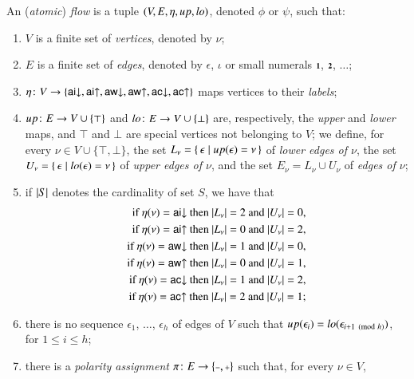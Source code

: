 \begin{definition}\label{definition:AtomicFlow}
An (\emph{atomic}) \emph{flow} is a tuple $(V,E,\eta,{\mathit up},{\mathit lo})$, denoted $\phi$ or $\psi$, such that:
\begin{enumerate}
\item $V$ is a finite set of \emph{vertices}, denoted by $\nu$;
\item $E$ is a finite set of \emph{edges}, denoted by $\epsilon$, $\iota$ or small numerals $\one$, $\two$, $\dots$;
\item $\eta\colon V\to\{{\mathsf{ai}{\downarrow}},{\mathsf{ai}{\uparrow}},{\mathsf{aw}{\downarrow}},{\mathsf{aw}{\uparrow}},{\mathsf{ac}{\downarrow}},{\mathsf{ac}{\uparrow}}\}$ maps vertices to their \emph{labels};
\item ${\mathit up}\colon E\to V\cup\{\top\}$ and ${\mathit lo}\colon E\to V\cup\{\bot\}$ are, respectively, the \emph{upper} and \emph{lower} maps, and $\top$ and $\bot$ are special vertices not belonging to $V$; we define, for every $\nu\in V\cup\{\top,\bot\}$, the set $L_\nu=\{\,\epsilon\mid{\mathit up}(\epsilon)=\nu\,\}$ of \emph{lower edges of $\nu$}, the set $U_\nu=\{\,\epsilon\mid{\mathit lo}(\epsilon)=\nu\,\}$ of \emph{upper edges of $\nu$}, and the set $E_\nu=L_\nu\cup U_\nu$ of \emph{edges of $\nu$};
\item if $\mathord\vert S\mathord\vert$ denotes the cardinality of set $S$, we have that
\begin{align*}
\mbox{if $\eta(\nu)={\mathsf{ai}{\downarrow}}$ then $\mathord\vert L_\nu\mathord\vert=2$ and $\mathord\vert U_\nu\mathord\vert=0$,}&\\
\mbox{if $\eta(\nu)={\mathsf{ai}{\uparrow}}$ then $\mathord\vert L_\nu\mathord\vert=0$ and $\mathord\vert U_\nu\mathord\vert=2$,}&\\
\mbox{if $\eta(\nu)={\mathsf{aw}{\downarrow}}$ then $\mathord\vert L_\nu\mathord\vert=1$ and $\mathord\vert U_\nu\mathord\vert=0$,}&\\
\mbox{if $\eta(\nu)={\mathsf{aw}{\uparrow}}$ then $\mathord\vert L_\nu\mathord\vert=0$ and $\mathord\vert U_\nu\mathord\vert=1$,}&\\
\mbox{if $\eta(\nu)={\mathsf{ac}{\downarrow}}$ then $\mathord\vert L_\nu\mathord\vert=1$ and $\mathord\vert U_\nu\mathord\vert=2$,}&\\
\mbox{if $\eta(\nu)={\mathsf{ac}{\uparrow}}$ then $\mathord\vert L_\nu\mathord\vert=2$ and $\mathord\vert U_\nu\mathord\vert=1$;}&
\end{align*}
\item\label{definition:AtomicFlow:item:Acyclic} there is no sequence $\epsilon_1$, $\dots$, $\epsilon_h$ of edges of $V$ such that ${\mathit up}(\epsilon_i)={\mathit lo}(\epsilon_{i+1\pmod h})$, for $1\le i\le h$;
\item\label{definition:AtomicFlow:item:PolarityAssignment} there is a \emph{polarity assignment} $\pi\colon E\to\{\pmi,\ppl\}$ such that, for every $\nu\in V$,

\end{enumerate}
\end{definition}
